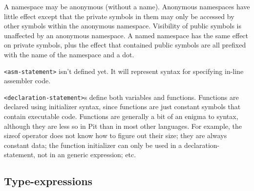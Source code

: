 A namespace may be anonymous (without a name).  Anonymous namespaces have little effect except that the private symbols
in them may only be accessed by other symbols within the anonymous namespace.  Visibility of public symbols is
unaffected by an anonymous namespace.  A named namespace has the same effect on private symbols, plus the effect that
contained public symbols are all prefixed with the name of the namespace and a dot.

\verb_<asm-statement>_ isn't defined yet.  It will represent syntax for specifying in-line assembler code.

\begin{sourcestyle}
\end{sourcestyle}

\verb_<declaration-statement>_s define both variables and functions.  Functions are declared using initializer syntax,
since functions are just constant symbols that contain executable code.  Functions are generally a bit of an enigma to
syntax, although they are less so in Pit than in most other languages.  For example, the sizeof operator does not know
how to figure out their size; they are always constant data; the function initializer can only be used in a
declaration-statement, not in an generic expression; etc.

\subsection{Type-expressions}

